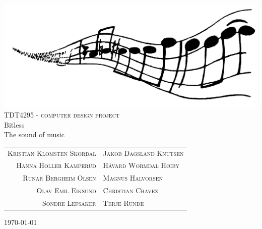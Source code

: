 \begin{titlepage}

\begin{center}

    \includegraphics[scale=0.05]{./figures/logo}\\[1cm]

\textsc{\LARGE TDT4295 - computer design project}\\[0.2cm]


{\huge Bitless}\\[0.2cm]
\small{The sound of music}\\[1cm]

\begin{table}[h]
\centering
\begin{tabular}{rl}
    \textsc{Kristian Klomsten Skordal}  & \textsc{Jakob Dagsland Knutsen} \\
    \textsc{Hanna Holler Kamperud}      & \textsc{Håvard Wormdal Høiby} \\
    \textsc{Runar Bergheim Olsen}       & \textsc{Magnus Halvorsen}	\\
    \textsc{Olav Emil Eiksund}          & \textsc{Christian Chavez} \\
    \textsc{Sondre Lefsaker}            & \textsc{Terje Runde}
\end{tabular}
\end{table}

\vfill
\large{\today}

\end{center}

\end{titlepage}
